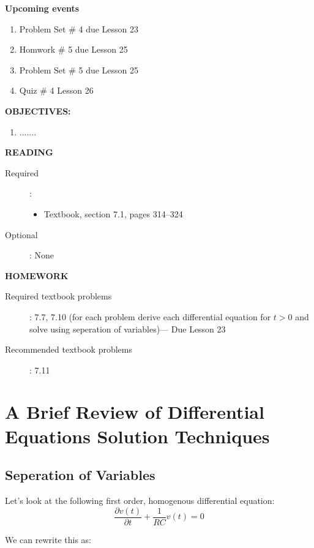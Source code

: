 \documentclass{handout}
\begin{document}
\maketitle

\textbf{Upcoming events}
\begin{enumerate}
\item Problem Set \# 4 due Lesson 23
\item Homwork \# 5 due Lesson 25
\item Problem Set \# 5 due Lesson 25
\item Quiz \# 4 Lesson 26
\end{enumerate}

\textbf{OBJECTIVES:}
\begin{enumerate}
\item .......
\end{enumerate}

\textbf{READING}
\begin{description}
\item [Required]:
\begin{itemize}
\item  Textbook, section 7.1, pages 314--324
\end{itemize}
\item [Optional]: None
\end{description}

\textbf{HOMEWORK}
\begin{description}
\item [Required textbook problems]: 7.7, 7.10 (for each problem derive each differential equation for $t>0$ and solve using seperation of variables)--- Due Lesson 23
\item [Recommended textbook problems]: 7.11
\end{description}

\section{A Brief Review of Differential Equations Solution Techniques}
\subsection{Seperation of Variables}
Let's look at the following first order, homogenous differential equation:
\begin{equation}
\frac{\partial v(t)}{\partial t}+\frac{1}{RC}v(t)=0
\end{equation}

We can rewrite this as:
\end{document}
